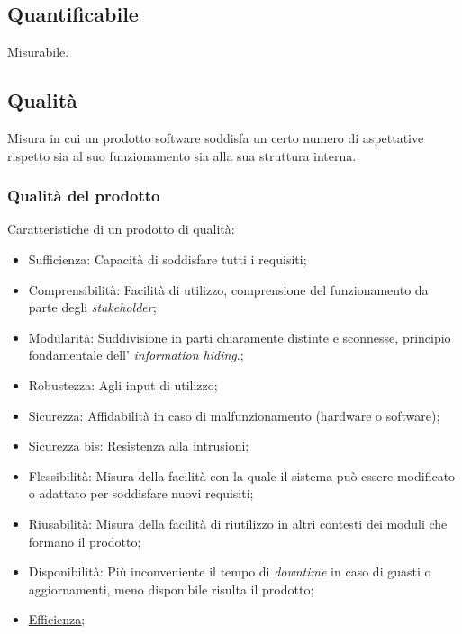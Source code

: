 
	\subsection{Quantificabile}
	\label{sec:quantificabile}
	Misurabile.
	
	\subsection{Qualità} 
	\label{sec:qualita}
	 Misura in cui un prodotto software soddisfa un certo numero di aspettative rispetto sia al suo funzionamento sia alla sua struttura interna.
	\subsubsection{Qualità del prodotto}
	Caratteristiche di un prodotto di qualità:
	\begin{itemize}  
	\item Sufficienza: Capacità di soddisfare tutti i requisiti;
	\item Comprensibilità: Facilità di utilizzo, comprensione del funzionamento da parte degli  \emph{stakeholder};
	\item Modularità: Suddivisione in parti chiaramente distinte e sconnesse, principio fondamentale dell' \emph{information hiding}.;
	\item Robustezza: Agli input di utilizzo;
	\item Sicurezza: Affidabilità in caso di malfunzionamento (hardware o software);
	\item Sicurezza bis: Resistenza alla intrusioni;
	\item Flessibilità: Misura della facilità con la quale il sistema può essere modificato o adattato per soddisfare nuovi requisiti;
	\item Riusabilità: Misura della facilità di riutilizzo in altri contesti dei moduli che formano il prodotto;
	\item Disponibilità: Più inconveniente il tempo di \emph{downtime} in caso di guasti o aggiornamenti, meno disponibile risulta il prodotto;	
	\item \underline{\hyperref[sec:efficienza]{Efficienza}};
	\end{itemize}
